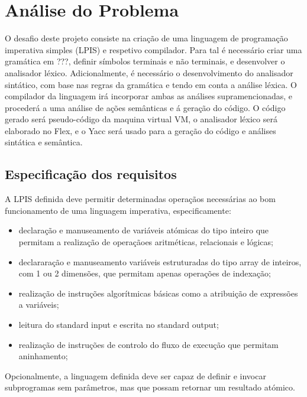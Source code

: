 \chapter{Análise do Problema}
\label{cap:analise}

O desafio deste projeto consiste na criação de uma linguagem de programação
imperativa simples (LPIS) e respetivo compilador.  Para tal é necessário criar
uma gramática em ???, definir símbolos terminais e não terminais, e desenvolver
o analisador léxico. Adicionalmente, é necessário o desenvolvimento do
analisador sintático, com base nas regras da gramática e tendo em conta
a análise léxica. O compilador da linguagem irá incorporar ambas as análises
supramencionadas, e procederá a uma análise de ações semânticas e á geração do
código.  O código gerado será pseudo-código da maquina virtual VM, o analisador
léxico será elaborado no Flex, e o Yacc será usado para a geração do código
e análises sintática e semântica.   


\section{Especificação dos requisitos}
\label{sec:especificacao:analise}

A LPIS definida deve permitir determinadas operaçãos necessárias ao bom
funcionamento de uma linguagem imperativa, especificamente:

\begin{itemize}
\item declaração e manuseamento de variáveis atómicas do tipo inteiro que
	permitam a realização de operaçãoes aritméticas, relacionais e lógicas;
\item declararação e manuseamento variáveis estruturadas do tipo array de
	inteiros, com 1 ou 2 dimensões, que permitam apenas operações de indexação;
\item realização de instruções algorítmicas básicas como a atribuição de
	expressões a variáveis;
\item leitura do standard input e escrita no standard output;
\item realização de instruções de controlo do fluxo de execução que permitam
	aninhamento;
\end{itemize}

Opcionalmente, a linguagem definida deve ser capaz de definir e invocar
subprogramas sem parâmetros, mas que possam retornar um resultado atómico.


